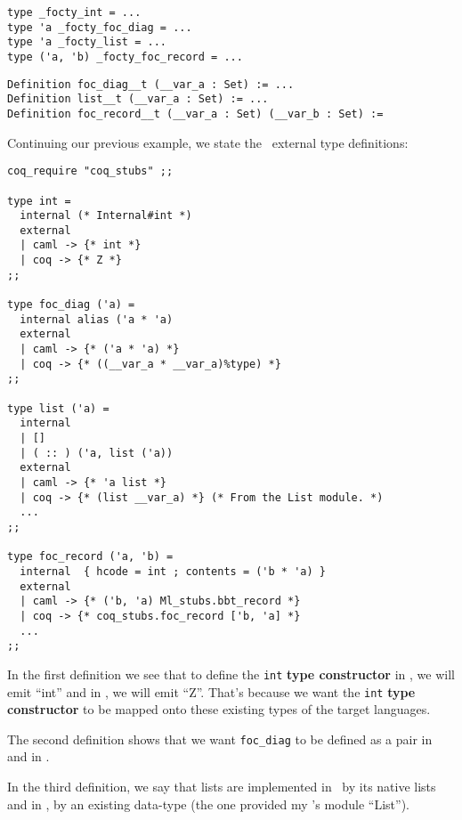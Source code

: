 {\footnotesize
\begin{lstlisting}[language=MyOCaml,
                   title=\ocaml\ code for external definitions]
type _focty_int = ...
type 'a _focty_foc_diag = ...
type 'a _focty_list = ...
type ('a, 'b) _focty_foc_record = ...
\end{lstlisting}}

{\footnotesize
\begin{lstlisting}[language=MyCoq,
                   title=\coq\ code for external definitions]
Definition foc_diag__t (__var_a : Set) := ...
Definition list__t (__var_a : Set) := ...
Definition foc_record__t (__var_a : Set) (__var_b : Set) :=
\end{lstlisting}}


Continuing our previous example, we state the \focalize\ external type
definitions:

{\footnotesize
\begin{lstlisting}[title=External type definitions (2)]
coq_require "coq_stubs" ;;

type int =
  internal (* Internal#int *)
  external
  | caml -> {* int *}
  | coq -> {* Z *}
;;

type foc_diag ('a) =
  internal alias ('a * 'a)
  external
  | caml -> {* ('a * 'a) *}
  | coq -> {* ((__var_a * __var_a)%type) *}
;;

type list ('a) =
  internal
  | []
  | ( :: ) ('a, list ('a))
  external
  | caml -> {* 'a list *}
  | coq -> {* (list __var_a) *} (* From the List module. *)
  ...
;;

type foc_record ('a, 'b) =
  internal  { hcode = int ; contents = ('b * 'a) }
  external
  | caml -> {* ('b, 'a) Ml_stubs.bbt_record *}
  | coq -> {* coq_stubs.foc_record ['b, 'a] *}
  ...
;;
\end{lstlisting}}

In the first definition we see that to define the {\tt int}
{\bf type constructor} in \ocaml, we will emit ``int'' and in \coq, we
will emit ``Z''. That's because we want the {\tt int}
{\bf type constructor} to be mapped onto these existing types of the
target languages.

The second definition shows that we want {\tt foc\_diag} to be defined
as a pair in \ocaml and in \coq.

In the third definition, we say that lists are implemented in \ocaml\
by its native lists and in \coq, by an existing data-type (the one
provided my \coq's module ``List'').

